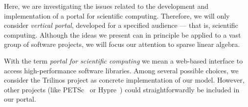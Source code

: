 \documentclass[11pt,relax]{SANDreport}
\begin{document}
Here, we are investigating the issues related to the development
and implementation of a portal for scientific computing. Therefore, we will
only consider {\sl vertical portal}, developed for a specified audience ---
that is, scientific computing. Although the ideas we present can in principle
be applied to a vast group of software projects, we will focus our attention
to sparse linear algebra.

With the term {\sl portal for scientific computing} we mean a web-based
interface to access high-performance software libraries. Among several
possible choices, we consider the Trilinos project as concrete implementation
of our model. However, other projects (like PETSc~\cite{petsc-guide} 
                                       or Hypre~\cite{hypre}) could
straightforwardly be included in our portal.
\end{document}
